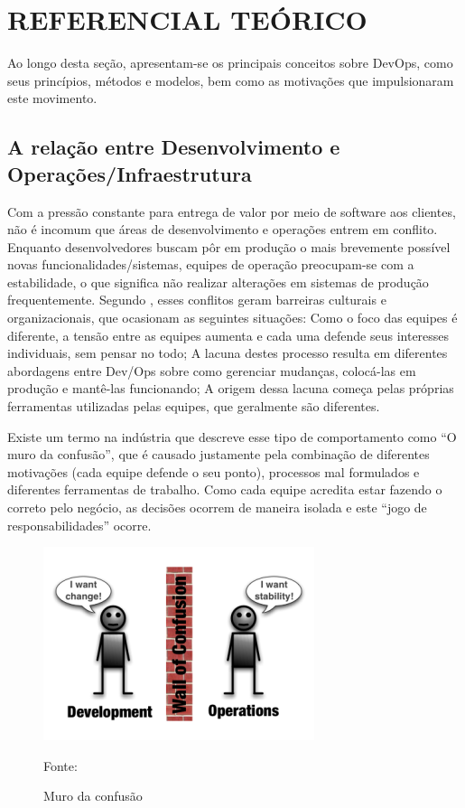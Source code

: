 \documentclass[twoside,english,brazilian]{UNISINOSartigo}
\newcommand{\source}[1]{\caption*{Fonte: {#1}} }
\begin{document}
\section{REFERENCIAL TEÓRICO}

Ao longo desta seção, apresentam-se os principais conceitos sobre DevOps, como seus princípios, métodos e modelos, bem como as motivações que impulsionaram este movimento.

\subsection{A relação entre Desenvolvimento  e Operações/Infraestrutura}
Com a pressão constante para entrega de valor por meio de software aos clientes, não é incomum que áreas de desenvolvimento e operações entrem em conflito. Enquanto desenvolvedores buscam pôr em produção o mais brevemente possível novas funcionalidades/sistemas, equipes de operação preocupam-se com a estabilidade, o que significa não realizar alterações em sistemas de produção frequentemente.
Segundo , esses conflitos geram barreiras culturais e organizacionais, que ocasionam as seguintes situações:
Como o foco das equipes é diferente, a tensão entre as equipes aumenta e cada uma defende seus interesses individuais, sem pensar no todo; A lacuna destes processo resulta em diferentes abordagens entre Dev/Ops sobre como gerenciar mudanças, colocá-las em produção e mantê-las funcionando; A origem dessa lacuna começa pelas próprias ferramentas utilizadas pelas equipes, que geralmente são diferentes.

Existe um termo na indústria que descreve esse tipo de comportamento como ``O muro da confusão'', que é causado justamente pela combinação de diferentes motivações (cada equipe defende o seu ponto), processos mal formulados e diferentes ferramentas de trabalho. Como cada equipe acredita estar fazendo o correto pelo negócio, as decisões ocorrem de maneira isolada e este ``jogo de responsabilidades'' ocorre.

\begin{figure}[h!]
    \centering
        \caption{Muro da confusão}
    \includegraphics[scale=.6]{imagens/WallOfConfusion.png}
    \source{}
    \label{fig:Muro da confusão}
    \end{figure}
\end{document}
